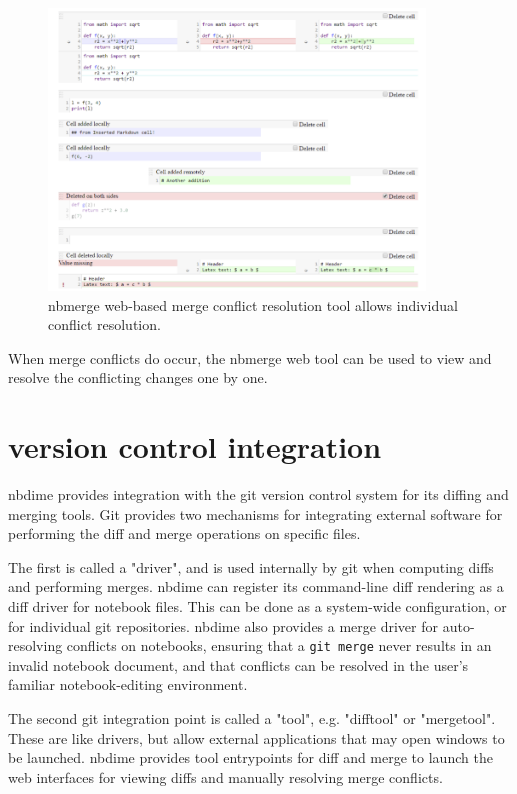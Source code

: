 \documentclass{deliverablereport}
\begin{document}
\begin{figure}
    \center
    \includegraphics[width=10cm]{img/nbmerge-web}
    \caption{nbmerge web-based merge conflict resolution tool allows individual conflict resolution.}
    \label{fig:nbmerge-web}
\end{figure}

When merge conflicts do occur, the nbmerge web tool can be used to view and resolve the conflicting changes one by one.



\section{version control integration} %
\label{sub:version_control_integration}

nbdime provides integration with the git version control system for its diffing and merging tools.
Git provides two mechanisms for integrating external software for
performing the diff and merge operations on specific files.

The first is called a "driver", and is used internally by git when computing diffs and performing merges. nbdime can register its command-line diff rendering as a diff driver for notebook files.
This can be done as a system-wide configuration, or for individual git repositories.
nbdime also provides a merge driver for auto-resolving conflicts on notebooks,
ensuring that a \texttt{git merge} never results in an invalid notebook document,
and that conflicts can be resolved in the user's familiar notebook-editing environment.

The second git integration point is called a "tool", e.g. "difftool" or "mergetool".
These are like drivers, but allow external applications that may open windows to be launched.
nbdime provides tool entrypoints for diff and merge to launch the web interfaces for viewing diffs
and manually resolving merge conflicts.
\end{document}
